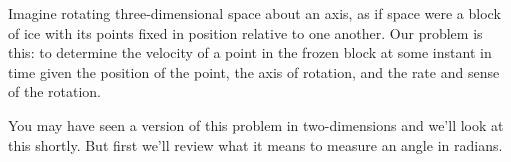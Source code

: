 \documentclass{ximera}
\begin{document}
Imagine rotating three-dimensional space about an axis, as if space were a block of ice with its points fixed in position relative to one another. Our problem is this: to determine the velocity of a point in the frozen block at some instant in time given the position of the point, the axis of rotation, and the rate and sense of the rotation.

 
\begin{onlineOnly}
    \begin{center}
\end{center}
\end{onlineOnly}





You may have seen a version of this problem in two-dimensions and we'll look at this shortly. But first we'll review what it means to measure an angle in radians.
\end{document}
